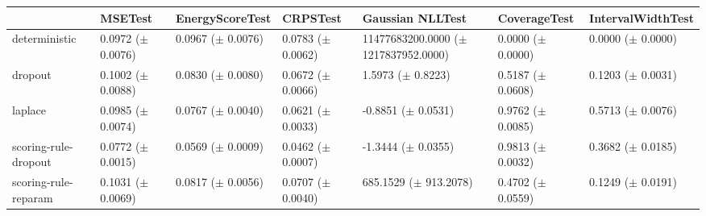 \begin{tabular}{lllllll}
\toprule
 & MSETest & EnergyScoreTest & CRPSTest & Gaussian NLLTest & CoverageTest & IntervalWidthTest \\
\midrule
deterministic & \makecell{0.0972 \\ ($\pm$ 0.0076)} & \makecell{0.0967 \\ ($\pm$ 0.0076)} & \makecell{0.0783 \\ ($\pm$ 0.0062)} & \makecell{11477683200.0000 \\ ($\pm$ 1217837952.0000)} & \makecell{0.0000 \\ ($\pm$ 0.0000)} & \makecell{0.0000 \\ ($\pm$ 0.0000)} \\
dropout & \makecell{0.1002 \\ ($\pm$ 0.0088)} & \makecell{0.0830 \\ ($\pm$ 0.0080)} & \makecell{0.0672 \\ ($\pm$ 0.0066)} & \makecell{1.5973 \\ ($\pm$ 0.8223)} & \makecell{0.5187 \\ ($\pm$ 0.0608)} & \makecell{0.1203 \\ ($\pm$ 0.0031)} \\
laplace & \makecell{0.0985 \\ ($\pm$ 0.0074)} & \makecell{0.0767 \\ ($\pm$ 0.0040)} & \makecell{0.0621 \\ ($\pm$ 0.0033)} & \makecell{-0.8851 \\ ($\pm$ 0.0531)} & \makecell{0.9762 \\ ($\pm$ 0.0085)} & \makecell{0.5713 \\ ($\pm$ 0.0076)} \\
scoring-rule-dropout & \makecell{0.0772 \\ ($\pm$ 0.0015)} & \makecell{0.0569 \\ ($\pm$ 0.0009)} & \makecell{0.0462 \\ ($\pm$ 0.0007)} & \makecell{-1.3444 \\ ($\pm$ 0.0355)} & \makecell{0.9813 \\ ($\pm$ 0.0032)} & \makecell{0.3682 \\ ($\pm$ 0.0185)} \\
scoring-rule-reparam & \makecell{0.1031 \\ ($\pm$ 0.0069)} & \makecell{0.0817 \\ ($\pm$ 0.0056)} & \makecell{0.0707 \\ ($\pm$ 0.0040)} & \makecell{685.1529 \\ ($\pm$ 913.2078)} & \makecell{0.4702 \\ ($\pm$ 0.0559)} & \makecell{0.1249 \\ ($\pm$ 0.0191)} \\
\bottomrule
\end{tabular}
